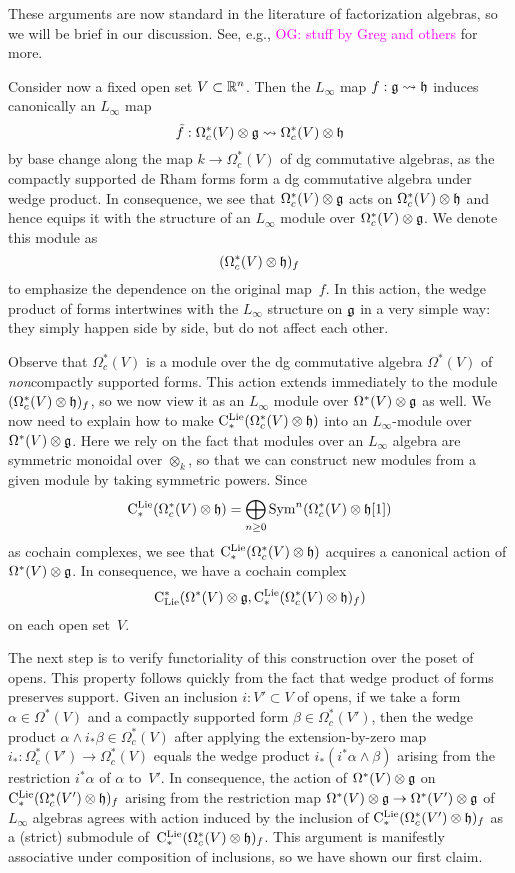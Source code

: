 \documentclass[11pt]{amsart}
\numberwithin{equation}{section}
\def\owen{\textcolor{magenta}{OG: }\textcolor{magenta}}
\begin{document}
\begin{rmk}
These arguments are now standard in the literature of factorization algebras, so we will be brief in our discussion.
See, e.g., \cite{CG1} \owen{stuff by Greg and others} for more.
\end{rmk}

Consider now a fixed open set $V \subset \mathbb R^n$.
Then the $L_\infty$ map $f: \mathfrak g \rightsquigarrow \mathfrak h$ induces canonically an $L_\infty$ map 
\[
\tilde{f}: \Omega^*_c(V) \otimes \mathfrak g \rightsquigarrow \Omega^*_c(V) \otimes \mathfrak h
\]
by base change along the map $k \to \Omega^*_c(V)$ of dg commutative algebras,
as the compactly supported de Rham forms form a dg commutative algebra under wedge product.
In consequence, we see that $\Omega^*_c(V) \otimes \mathfrak g$ acts on $\Omega^*_c(V) \otimes \mathfrak h$ and hence equips it with the structure of an $L_\infty$ module over $\Omega^*_c(V) \otimes \mathfrak g$.
We denote this module as
\[
(\Omega^*_c(V) \otimes \mathfrak h)_f
\]
to emphasize the dependence on the original map~$f$.
In this action, the wedge product of forms intertwines with the $L_\infty$ structure on $\mathfrak g$ in a very simple way: 
they simply happen side by side, but do not affect each other.

Observe that $\Omega^*_c(V)$ is a module over the dg commutative algebra $\Omega^*(V)$ of {\em non}\/compactly supported forms.
This action extends immediately to the module $(\Omega^*_c(V) \otimes \mathfrak h)_f$, 
so we now view it as an $L_\infty$ module over $\Omega^*(V) \otimes \mathfrak g$ as well.
We now need to explain how to make ${\rm C}^{\rm Lie}_*(\Omega^*_c(V) \otimes \mathfrak h)$ into an $L_\infty$-module over $\Omega^*(V) \otimes \mathfrak g$.
Here we rely on the fact that modules over an $L_\infty$ algebra are symmetric monoidal over $\otimes_k$, 
so that we can construct new modules from a given module by taking symmetric powers.
Since
\[
{\rm C}^{\rm Lie}_*(\Omega^*_c(V) \otimes \mathfrak h) = \bigoplus_{n \geq 0} {\rm Sym}^n(\Omega^*_c(V) \otimes \mathfrak h[1])
\]
as cochain complexes,
we see that ${\rm C}^{\rm Lie}_*(\Omega^*_c(V) \otimes \mathfrak h)$ acquires a canonical action of $\Omega^*(V) \otimes \mathfrak g$.
In consequence, we have a cochain complex
\[
{\rm C}_{\rm Lie}^*(\Omega^*(V) \otimes \mathfrak g, {\rm C}^{\rm Lie}_*(\Omega^*_c(V) \otimes \mathfrak h)_f)
\]
on each open set~$V$.

The next step is to verify functoriality of this construction over the poset of opens.
This property follows quickly from the fact that wedge product of forms preserves support.
Given an inclusion $i: V' \subset V$ of opens, if we take a form $\alpha \in \Omega^*(V)$ and a compactly supported form $\beta \in \Omega^*_c(V')$, then the wedge product $\alpha \wedge i_* \beta \in \Omega^*_c(V)$ after applying the extension-by-zero map $i_*: \Omega^*_c(V') \to \Omega^*_c(V)$ equals the wedge product $i_*(i^*\alpha \wedge \beta)$ arising from the restriction $i^* \alpha$ of $\alpha$ to~$V'$.
In consequence, the action of $\Omega^*(V) \otimes \mathfrak g$ on ${\rm C}^{\rm Lie}_*(\Omega^*_c(V') \otimes \mathfrak h)_f$ arising from the restriction map $\Omega^*(V) \otimes \mathfrak g \to \Omega^*(V') \otimes \mathfrak g$ of $L_\infty$ algebras agrees with action induced by the inclusion of ${\rm C}^{\rm Lie}_*(\Omega^*_c(V') \otimes \mathfrak h)_f$ as a (strict) submodule of~${\rm C}^{\rm Lie}_*(\Omega^*_c(V) \otimes \mathfrak h)_f$.
This argument is manifestly associative under composition of inclusions, so we have shown our first claim.
\end{document}
